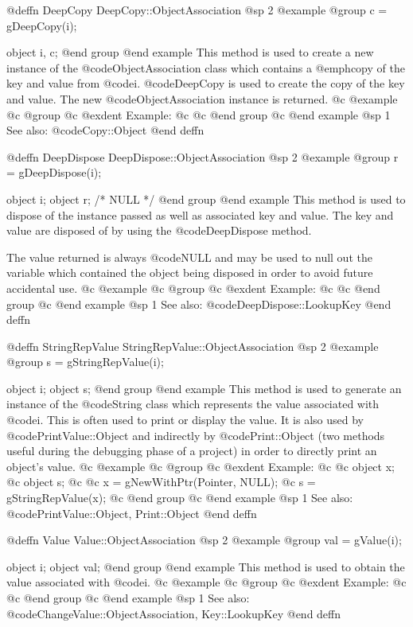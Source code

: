 @deffn {DeepCopy} DeepCopy::ObjectAssociation
@sp 2
@example
@group
c = gDeepCopy(i);

object  i, c;
@end group
@end example
This method is used to create a new instance of the
@code{ObjectAssociation} class which contains a @emph{copy} of the key
and value from @code{i}.  @code{DeepCopy}
is used to create the copy of the key and value.  The new
@code{ObjectAssociation} instance is returned.
@c @example
@c @group
@c @exdent Example:
@c 
@c @end group
@c @end example
@sp 1
See also:  @code{Copy::Object}
@end deffn











@deffn {DeepDispose} DeepDispose::ObjectAssociation
@sp 2
@example
@group
r = gDeepDispose(i);

object  i;
object  r;     /*  NULL  */
@end group
@end example
This method is used to dispose of the instance passed as well as
associated key and value.  The key and value are disposed of by using
the @code{DeepDispose} method.  

The value returned is always @code{NULL} and may be used to null out
the variable which contained the object being disposed in order to
avoid future accidental use.
@c @example
@c @group
@c @exdent Example:
@c 
@c @end group
@c @end example
@sp 1
See also:  @code{DeepDispose::LookupKey}
@end deffn








@deffn {StringRepValue} StringRepValue::ObjectAssociation
@sp 2
@example
@group
s = gStringRepValue(i);

object  i;
object  s;
@end group
@end example
This method is used to generate an instance of the @code{String} class
which represents the value associated with @code{i}.  This is often
used to print or display the value.  It is also used by
@code{PrintValue::Object} and indirectly by @code{Print::Object}
(two methods useful during the debugging phase of a project)
in order to directly print an object's value.
@c @example
@c @group
@c @exdent Example:
@c 
@c object  x;
@c object  s;
@c 
@c x = gNewWithPtr(Pointer, NULL);
@c s = gStringRepValue(x);
@c @end group
@c @end example
@sp 1
See also:  @code{PrintValue::Object, Print::Object}
@end deffn










@deffn {Value} Value::ObjectAssociation
@sp 2
@example
@group
val = gValue(i);

object  i;
object  val;
@end group
@end example
This method is used to obtain the value associated with
@code{i}.
@c @example
@c @group
@c @exdent Example:
@c 
@c @end group
@c @end example
@sp 1
See also:  @code{ChangeValue::ObjectAssociation, Key::LookupKey}
@end deffn




